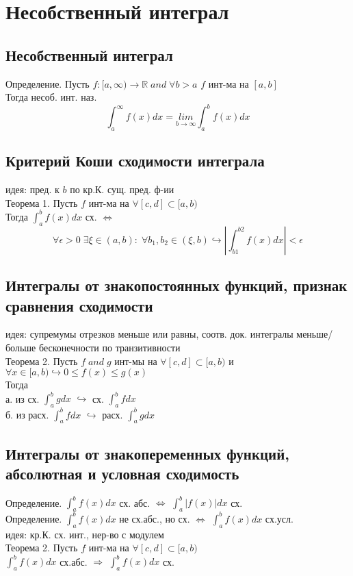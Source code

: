 \documentclass{article}
\begin{document}
\newpage
\section{Несобственный интеграл}
\subsection{Несобственный интеграл}
Определение. Пусть $f:[a,\infty) \rightarrow \mathbb R \; and \; \forall b>a$ $f$ инт-ма на $[a,b]$ \\
Тогда несоб. инт. наз.
\begin{equation*}
    \int_a^\infty f(x) dx = \underset{b \rightarrow \infty}{lim} \int_a^b f(x) dx
\end{equation*}
\subsection{Критерий Коши сходимости интеграла}
идея: пред. к $b$ по кр.К. сущ. пред. ф-ии \\
Теорема 1. Пусть $f$ инт-ма на $\forall[c,d] \subset [a,b)$ \\
Тогда $\int_a^b f(x) dx$ сх. $\Leftrightarrow$
\begin{equation*}
    \forall \epsilon > 0 \; \exists \xi \in (a,b): \; \forall b_1,b_2 \in (\xi, b) \hookrightarrow |\int_{b1}^{b2}f(x)dx|<\epsilon
\end{equation*}
\subsection{Интегралы от знакопостоянных функций, признак сравнения сходимости}
идея: супремумы отрезков меньше или равны, соотв. док. интегралы меньше/больше бесконечности по транзитивности \\
Теорема 2. Пусть $f \; and \; g$ инт-мы на $\forall [c,d] \subset [a,b)$ и $\forall x \in [a,b) \hookrightarrow 0 \leq f(x) \leq g(x)$ \\
Тогда \\
а. из сх. $\int_a^b g dx$ $\hookrightarrow$ сх. $\int_a^b f dx$ \\
б. из расх. $\int_a^b f dx$ $\hookrightarrow$ расх. $\int_a^b g dx$
\subsection{Интегралы от знакопеременных функций, абсолютная и условная сходимость}
Определение. $\int_a^b f(x) dx$ сх. абс. $\Leftrightarrow$ $\int_a^b |f(x)| dx$ сх. \\
Определение.  $\int_a^b f(x) dx$ не сх.абс., но сх. $\Leftrightarrow$ $\int_a^b f(x) dx$ сх.усл. \\
идея: кр.К. сх. инт., нер-во с модулем \\
Теорема 2. Пусть $f$ инт-ма на $\forall [c,d] \subset [a,b)$ \\
$\int_a^b f(x) dx$ сх.абс. $\Rightarrow$ $\int_a^b f(x) dx$ сх.
\end{document}
